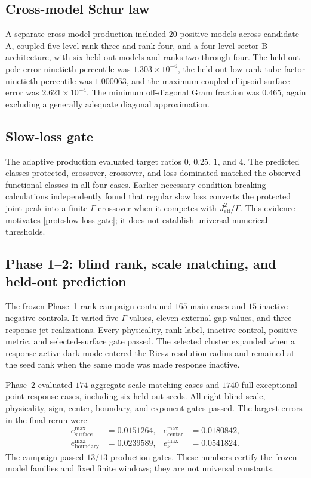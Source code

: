 \documentclass[11pt]{article}
\theoremstyle{definition}
\theoremstyle{remark}
\begin{document}
\subsection{Cross-model Schur law}

A separate cross-model production included $20$ positive models across candidate-A, coupled five-level rank-three and rank-four, and a four-level sector-B architecture, with six held-out models and ranks two through four. The held-out pole-error ninetieth percentile was $1.303\times10^{-6}$, the held-out low-rank tube factor ninetieth percentile was $1.000063$, and the maximum coupled ellipsoid surface error was $2.621\times10^{-4}$. The minimum off-diagonal Gram fraction was $0.465$, again excluding a generally adequate diagonal approximation.

\subsection{Slow-loss gate}

The adaptive production evaluated target ratios $0$, $0.25$, $1$, and $4$. The predicted classes protected, crossover, crossover, and loss dominated matched the observed functional classes in all four cases. Earlier necessary-condition breaking calculations independently found that regular slow loss converts the protected joint peak into a finite-$\Gamma$ crossover when it competes with $J_{\mathrm{eff}}^2/\Gamma$. This evidence motivates \cref{prot:slow-loss-gate}; it does not establish universal numerical thresholds.

\subsection{Phase 1--2: blind rank, scale matching, and held-out prediction}

The frozen Phase~1 rank campaign contained $165$ main cases and $15$ inactive negative controls.  It varied five $\Gamma$ values, eleven external-gap values, and three response-jet realizations.  Every physicality, rank-label, inactive-control, positive-metric, and selected-surface gate passed.  The selected cluster expanded when a response-active dark mode entered the Riesz resolution radius and remained at the seed rank when the same mode was made response inactive.

Phase~2 evaluated $174$ aggregate scale-matching cases and $1740$ full exceptional-point response cases, including six held-out seeds.  All eight blind-scale, physicality, sign, center, boundary, and exponent gates passed.  The largest errors in the final rerun were
\begin{equation}
 \begin{aligned}
  e_{\mathrm{surface}}^{\max}&=0.0151264,&
  e_{\mathrm{center}}^{\max}&=0.0180842,\\
  e_{\mathrm{boundary}}^{\max}&=0.0239589,&
  e_{\nu}^{\max}&=0.0541824.
 \end{aligned}
 \label{eq:phase12-final-errors}
\end{equation}
The campaign passed $13/13$ production gates.  These numbers certify the frozen model families and fixed finite windows; they are not universal constants.
\end{document}
